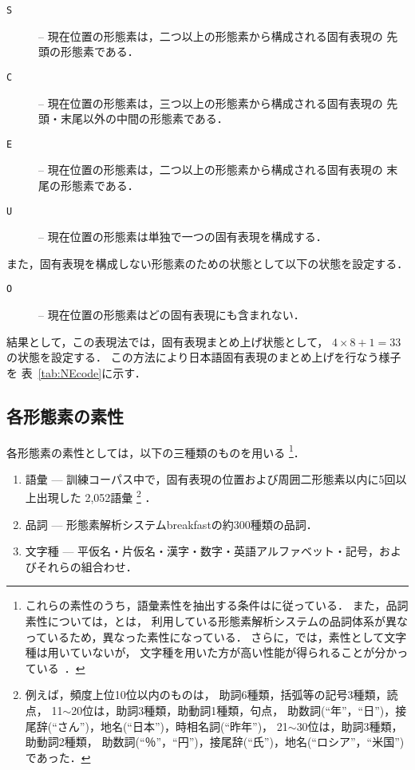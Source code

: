 \begin{description} 
\item[{\tt S}] -- 現在位置の形態素は，二つ以上の形態素から構成される固有表現の
		先頭の形態素である．
\item[{\tt C}] -- 現在位置の形態素は，三つ以上の形態素から構成される固有表現の
		先頭・末尾以外の中間の形態素である．
\item[{\tt E}] -- 現在位置の形態素は，二つ以上の形態素から構成される固有表現の
		末尾の形態素である．
\item[{\tt U}] -- 現在位置の形態素は単独で一つの固有表現を構成する．
\end{description}
また，固有表現を構成しない形態素のための状態として以下の状態を設定する．
\begin{description} 
\item[{\tt O}] -- 現在位置の形態素はどの固有表現にも含まれない．
\end{description}
結果として，この表現法では，固有表現まとめ上げ状態として，
$4\times 8+1=33$の状態を設定する．
この方法により日本語固有表現のまとめ上げを行なう様子を
表~\ref{tab:NEcode}に示す．

\subsection{各形態素の素性}
\label{subsec:ftr}

各形態素の素性としては，以下の三種類のものを用いる
\footnote{
   これらの素性のうち，語彙素性を抽出する条件は\cite{Uchimoto00aj}に従っている．
   また，品詞素性については，\cite{Uchimoto00aj}とは，
   利用している形態素解析システムの品詞体系が異なっているため，異なった素性になっている．
   さらに，\cite{Uchimoto00aj}では，素性として文字種は用いていないが，
   文字種を用いた方が高い性能が得られることが分かっている~\cite{Sassano00bjx}．
}．
\begin{enumerate}
\item 語彙 --- 訓練コーパス中で，固有表現の位置および周囲二形態素以内に5回以上出現した
	2,052語彙
	\footnote{
	例えば，頻度上位10位以内のものは，
	助詞6種類，括弧等の記号3種類，読点，
	11$\sim$20位は，助詞3種類，助動詞1種類，句点，
	助数詞(``年''，``日'')，接尾辞(``さん'')，地名(``日本'')，時相名詞(``昨年'')，
	21$\sim$30位は，助詞3種類，助動詞2種類，
	助数詞(``％''，``円'')，接尾辞(``氏'')，地名(``ロシア''，``米国'')であった．
	}
	．
\item 品詞 --- 形態素解析システム{\sc breakfast}の約300種類の品詞．
\item 文字種 --- 平仮名・片仮名・漢字・数字・英語アルファベット・記号，およびそれらの組合わせ．
\end{enumerate}


